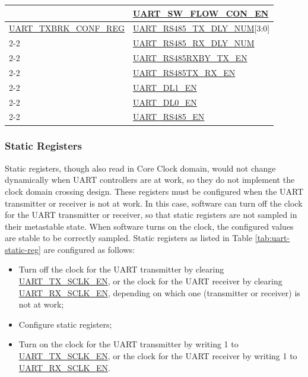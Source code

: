 \documentclass[main\_\_EN.tex]{subfiles}
\begin{document}
\begin{longtable}[c]{|p{6cm}|p{6cm}|}
 & \hyperref[fielddesc:UARTSWFLOWCONEN]{UART\_SW\_FLOW\_CON\_EN} \\\hline
\hyperref[regdesc:UARTTXBRKCONFREG]{UART\_TXBRK\_CONF\_REG} & \hyperref[fielddesc:UARTRS485TXDLYNUM]{UART\_RS485\_TX\_DLY\_NUM}[3:0] \\\cline{2-2} 
 & \hyperref[fielddesc:UARTRS485RXDLYNUM]{UART\_RS485\_RX\_DLY\_NUM} \\\cline{2-2} 
 & \hyperref[fielddesc:UARTRS485RXBYTXEN]{UART\_RS485RXBY\_TX\_EN} \\\cline{2-2} 
 & \hyperref[fielddesc:UARTRS485TXRXEN]{UART\_RS485TX\_RX\_EN} \\\cline{2-2} 
 & \hyperref[fielddesc:UARTDL1EN]{UART\_DL1\_EN} \\\cline{2-2} 
 & \hyperref[fielddesc:UARTDL0EN]{UART\_DL0\_EN} \\\cline{2-2} 
 & \hyperref[fielddesc:UARTRS485EN]{UART\_RS485\_EN} \\\hline
\end{longtable}

\subsubsection{Static Registers}\label{sec:uart-static-reg}

Static registers, though also read in Core Clock domain, would not change dynamically when UART controllers are at work, so they do not implement the clock domain crossing design. These registers must be configured when the UART transmitter or receiver is not at work. In this case, software can turn off the clock for the UART transmitter or receiver, so that static registers are not sampled in their metastable state. When software turns on the clock, the configured values are stable to be correctly sampled. Static registers as listed in Table \ref{tab:uart-static-reg} are configured as follows:

\begin{itemize}
    \item Turn off the clock for the UART transmitter by clearing \hyperref[fielddesc:UARTTXSCLKEN]{UART\_TX\_SCLK\_EN}, or the clock for the UART receiver by clearing \hyperref[fielddesc:UARTRXSCLKEN]{UART\_RX\_SCLK\_EN}, depending on which one (transmitter or receiver) is not at work;
    \item Configure static registers;
    \item Turn on the clock for the UART transmitter by writing 1 to \hyperref[fielddesc:UARTTXSCLKEN]{UART\_TX\_SCLK\_EN}, or the clock for the UART receiver by writing 1 to \hyperref[fielddesc:UARTRXSCLKEN]{UART\_RX\_SCLK\_EN}.
\end{itemize}
\end{document}
